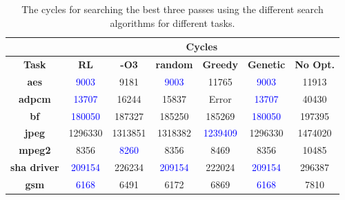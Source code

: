 \begin{table*}[!t]
\caption{The cycles for searching the best three passes using the different search algorithms for different tasks.}
\label{tab:3pass}
\hskip3.3cm\begin{tabular}{|c|c|c|c|c|c|c|}
\hline
\textbf{\textbf{}}  & \multicolumn{6}{c|}{\textbf{Cycles}}                                                                                                                                                                \\ \hline
\textbf{Task}       & \textbf{RL}        & \textbf{-O3}      & \textbf{random}    & \textbf{Greedy}     & \textbf{Genetic} & \textbf{No Opt.} \\ \hline
\textbf{aes}        & \textcolor{blue}{9003}   & 9181                               & \textcolor{blue}{9003}   & 11765                                & \textcolor{blue}{9003}                              & 11913   \\ \hline
\textbf{adpcm}      & \textcolor{blue}{13707}  & 16244                              & 15837                               & Error                                   & \textcolor{blue}{13707}                               & 40430   \\ \hline
\textbf{bf}         & \textcolor{blue}{180050} & 187327                             & 185250                              & 185269                               & \textcolor{blue}{180050}                              & 197395  \\ \hline
\textbf{jpeg}       & 1296330                             & 1313851                            & 1318382                             & \textcolor{blue}{1239409} & 1296330                              & 1474020 \\ \hline
\textbf{mpeg2}      & 8356                                & \textcolor{blue}{8260}  & 8356                                & 8469                                 & 8356                              & 10485   \\ \hline
\textbf{sha driver} & \textcolor{blue}{209154} & 226234                             & \textcolor{blue}{209154} & 222024                               & \textcolor{blue}{209154}                               & 296387  \\ \hline
\textbf{gsm}        & \textcolor{blue}{6168}   & 6491                               & 6172                                & 6869                                 & \textcolor{blue}{6168}                               & 7810    \\ \hline

\end{tabular}
\end{table*}
